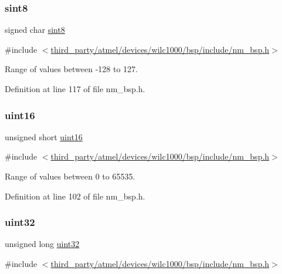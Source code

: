 \subsubsection{\texorpdfstring{sint8}{sint8}}
{\footnotesize\ttfamily signed char \hyperlink{group__DataT_gae35f10ffd0ac8dd2bc3e794da9bdfbc7}{sint8}}



{\ttfamily \#include $<$\hyperlink{nm__bsp_8h}{third\+\_\+party/atmel/devices/wilc1000/bsp/include/nm\+\_\+bsp.\+h}$>$}



Range of values between -\/128 to 127. 



Definition at line 117 of file nm\+\_\+bsp.\+h.

\mbox{\label{group__DataT_ga1daa745171fc6e31d942c161422a76f9}} 
\subsubsection{\texorpdfstring{uint16}{uint16}}
{\footnotesize\ttfamily unsigned short \hyperlink{group__DataT_ga1daa745171fc6e31d942c161422a76f9}{uint16}}



{\ttfamily \#include $<$\hyperlink{nm__bsp_8h}{third\+\_\+party/atmel/devices/wilc1000/bsp/include/nm\+\_\+bsp.\+h}$>$}



Range of values between 0 to 65535. 



Definition at line 102 of file nm\+\_\+bsp.\+h.

\mbox{\label{group__DataT_ga100e7c691a47d6978527c479a0158245}} 
\subsubsection{\texorpdfstring{uint32}{uint32}}
{\footnotesize\ttfamily unsigned long \hyperlink{group__DataT_ga100e7c691a47d6978527c479a0158245}{uint32}}



{\ttfamily \#include $<$\hyperlink{nm__bsp_8h}{third\+\_\+party/atmel/devices/wilc1000/bsp/include/nm\+\_\+bsp.\+h}$>$}



